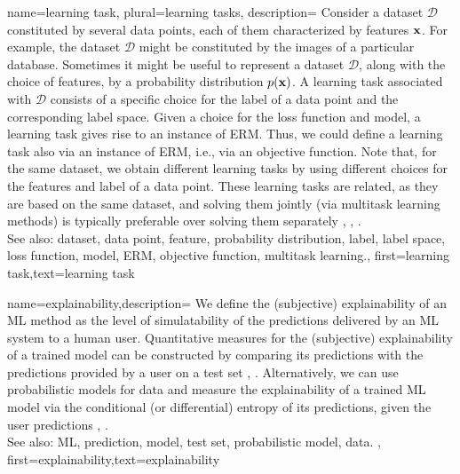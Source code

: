 {name={learning task}, plural={learning tasks}, description=
	{Consider a dataset $\mathcal{D}$ constituted by several data points, each of them 
	 characterized by features ${\bf x}$. For example, the dataset $\mathcal{D}$ 
	 might be constituted by the images of a particular database. Sometimes it might be useful 
	 to represent a dataset $\mathcal{D}$, along with the choice of features, by a probability distribution $p({\bf x})$. 
	 A learning task associated with $\mathcal{D}$ consists of a specific 
	 choice for the label of a data point and the corresponding label space. 
	 Given a choice for the loss function and model, a learning task gives rise to an 
	 instance of ERM. Thus, we could define a learning task also via an instance of ERM, i.e., 
	 via an objective function. Note that, for the same dataset, we obtain different learning tasks by using 
	 different choices for the features and label of a data point. These learning 
	 tasks are related, as they are based on the same dataset, and solving them jointly 
	 (via multitask learning methods) is typically preferable over solving them separately \cite{Caruana:1997wk}, \cite{JungGaphLassoSPL}, \cite{CSGraphSelJournal}.
	 			\\ 
		See also: dataset, data point, feature, probability distribution, label, label space, loss function, model, ERM, objective function, multitask learning.},
	first={learning task},text={learning task}
}

{name={explainability},description=
		{We define the (subjective) explainability of an ML method 
			as the level of simulatability \cite{Colin:2022aa} of the predictions 
			delivered by an ML system to a human user. Quantitative measures for the 
			(subjective) explainability of a trained model can be constructed by 
			comparing its predictions with the predictions provided by a user 
			on a test set \cite{Colin:2022aa}, \cite{Zhang:2024aa}. Alternatively, we can use 
			probabilistic models for data and measure the explainability of a trained ML 
			model via the conditional (or differential) entropy of its predictions, given the user predictions \cite{JunXML2020}, \cite{Chen2018}.
						\\ 
		See also: ML, prediction, model, test set, probabilistic model, data.
		},
		first={explainability},text={explainability}
	}

